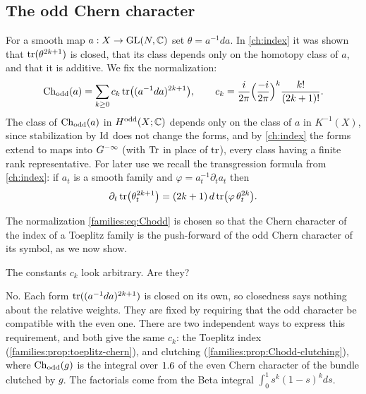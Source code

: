 \subsection{The odd Chern character}
For a smooth map $a:X\to\operatorname{GL}(N,\mathbb{C})$ set $\theta=a^{-1}da$. In \cref{ch:index}
it was shown that $\operatorname{tr}(\theta^{2k+1})$ is closed, that its class depends only
on the homotopy class of $a$, and that it is additive. We fix the
normalization:
\begin{equation}\label{families:eq:Chodd}
  \operatorname{Ch}_{\mathrm{odd}}(a)=\sum_{k\ge0}c_k\operatorname{tr}\bigl((a^{-1}da)^{2k+1}\bigr),\qquad
  c_k=\frac{i}{2\pi}\Bigl(\frac{-i}{2\pi}\Bigr)^k\frac{k!}{(2k+1)!}.
\end{equation}
The class of $\operatorname{Ch}_{\mathrm{odd}}(a)$ in $H^{\mathrm{odd}}(X;\mathbb{C})$ depends only on the class of $a$ in
$K^{-1}(X)$, since stabilization by $\operatorname{Id}$ does not change the forms, and by
\cref{ch:index} the forms extend to maps into $G^{-\infty}$ (with $\operatorname{Tr}$ in place of
$\operatorname{tr}$), every class having a finite rank representative. For later use we
recall the transgression formula from \cref{ch:index}: if $a_t$ is a smooth
family and $\varphi=a_t^{-1}\partial_ta_t$ then
\begin{equation}\label{families:eq:odd-transgression}
  \partial_t\operatorname{tr}\bigl(\theta_t^{2k+1}\bigr)=(2k+1)\,d\operatorname{tr}\bigl(\varphi\,
  \theta_t^{2k}\bigr).
\end{equation}

The normalization \eqref{families:eq:Chodd} is chosen so that the Chern character
of the index of a Toeplitz family is the push-forward of the odd Chern
character of its symbol, as we now show.

\begin{question}
  The constants $c_k$ look arbitrary. Are they?
\end{question}
\begin{answer}
  No. Each form $\operatorname{tr}((a^{-1}da)^{2k+1})$ is closed on its own, so closedness says
  nothing about the relative weights. They are fixed by requiring that the odd
  character be compatible with the even one. There are two independent ways to
  express this requirement, and both give the same $c_k$: the Toeplitz index
  (\cref{families:prop:toeplitz-chern}), and clutching
  (\cref{families:prop:Chodd-clutching}), where $\operatorname{Ch}_{\mathrm{odd}}(g)$ is the integral over
  $1.6$ of the even Chern character of the bundle clutched by $g$. The factorials
  come from the Beta integral $\int_0^1s^k(1-s)^kds$.
\end{answer}


